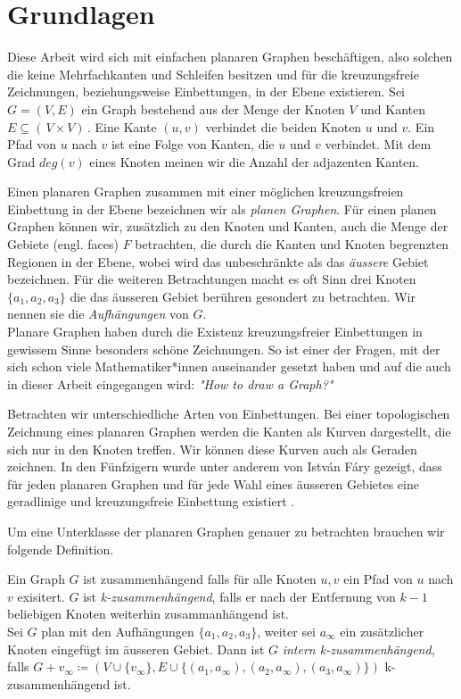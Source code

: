 \chapter{Grundlagen}\label{pre}

Diese Arbeit wird sich mit einfachen planaren Graphen beschäftigen, also solchen die keine Mehrfachkanten und Schleifen besitzen und für die kreuzungsfreie Zeichnungen, beziehungsweise Einbettungen, in der Ebene existieren. Sei $G = (V,E)$ ein Graph bestehend aus der Menge der Knoten $V$ und Kanten $E \subseteq ( \,V \times V ) \,$. Eine Kante $(u,v)$ verbindet die beiden Knoten $u$ und $v$. Ein Pfad von $u$ nach $v$ ist eine Folge von Kanten, die $u$ und $v$ verbindet. Mit dem Grad $deg(v)$ eines Knoten meinen wir die Anzahl der adjazenten Kanten.\ 

Einen planaren Graphen zusammen mit einer möglichen kreuzungsfreien Einbettung in der Ebene bezeichnen wir als \textit{planen Graphen}. Für einen planen Graphen können wir, zusätzlich zu den Knoten und Kanten, auch die Menge der Gebiete (engl. faces) $F$ betrachten, die durch die Kanten und Knoten begrenzten Regionen in der Ebene, wobei wird das unbeschränkte als das \textit{äussere} Gebiet bezeichnen. Für die weiteren Betrachtungen macht es oft Sinn drei Knoten $\{a_1,a_2,a_3\}$ die das äusseren Gebiet berühren gesondert zu betrachten. Wir nennen sie die \textit{Aufhängungen} von $G$. \\

Planare Graphen haben durch die Existenz kreuzungsfreier Einbettungen in gewissem Sinne besonders schöne Zeichnungen. So ist einer der Fragen, mit der sich schon viele Mathematiker*innen auseinander gesetzt haben und auf die auch in dieser Arbeit eingegangen wird: \textit{"How to draw a Graph?"}\cite{tutte63}

Betrachten wir unterschiedliche Arten von Einbettungen. Bei einer topologischen Zeichnung eines planaren Graphen werden die Kanten als Kurven dargestellt, die sich nur in den Knoten treffen. Wir können diese Kurven auch als Geraden zeichnen. In den Fünfzigern wurde unter anderem von István Fáry gezeigt, dass für jeden planaren Graphen und für jede Wahl eines äusseren Gebietes eine geradlinige und kreuzungsfreie Einbettung existiert \cite{fary48}.

Um eine Unterklasse der planaren Graphen genauer zu betrachten brauchen wir folgende Definition.

\begin{definition}\label{int_3_con}
Ein Graph $G$ ist zusammenhängend falls für alle Knoten $u,v$ ein Pfad von $u$ nach $v$ exisitert. $G$ ist \textit{k-zusammenhängend}, falls er nach der Entfernung von $k-1$ beliebigen Knoten weiterhin zusammanhängend ist.\\
Sei $G$ plan mit den Aufhängungen $\{a_1,a_2,a_3\}$, weiter sei $a_\infty$ ein zusätzlicher Knoten eingefügt im äusseren Gebiet. Dann ist $G$ \textit{intern k-zusammenhängend}, falls $G+v_\infty\coloneqq(V\cup\{v_\infty \},E\cup \{(a_1,a_\infty),(a_2,a_\infty),(a_3,a_\infty)\})$ k-zusammenhängend ist. 
\end{definition}

